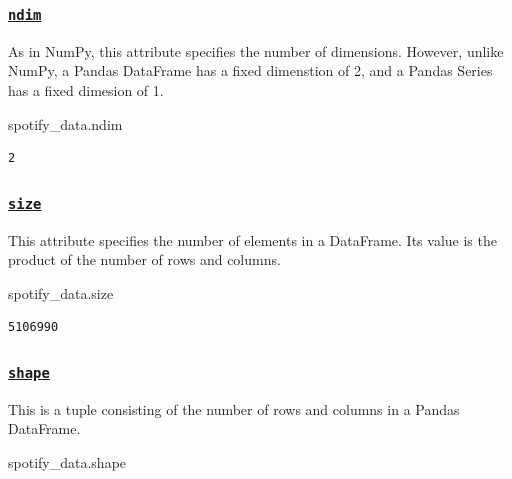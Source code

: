 \documentclass[
  letterpaper,
  DIV=11,
  numbers=noendperiod]{scrreprt}
\newenvironment{Shaded}{\begin{snugshade}}{\end{snugshade}}
\newcommand{\NormalTok}[1]{\textcolor[rgb]{0.00,0.23,0.31}{#1}}
\begin{document}
\hypertarget{ndim-1}{%
\subsubsection{\texorpdfstring{\href{https://pandas.pydata.org/docs/reference/api/pandas.DataFrame.ndim.html}{\texttt{ndim}}}{ndim}}\label{ndim-1}}

As in NumPy, this attribute specifies the number of dimensions. However,
unlike NumPy, a Pandas DataFrame has a fixed dimenstion of 2, and a
Pandas Series has a fixed dimesion of 1.

\begin{Shaded}
\begin{Highlighting}[]
\NormalTok{spotify\_data.ndim}
\end{Highlighting}
\end{Shaded}

\begin{verbatim}
2
\end{verbatim}

\hypertarget{size-1}{%
\subsubsection{\texorpdfstring{\href{https://pandas.pydata.org/docs/reference/api/pandas.DataFrame.size.html}{\texttt{size}}}{size}}\label{size-1}}

This attribute specifies the number of elements in a DataFrame. Its
value is the product of the number of rows and columns.

\begin{Shaded}
\begin{Highlighting}[]
\NormalTok{spotify\_data.size}
\end{Highlighting}
\end{Shaded}

\begin{verbatim}
5106990
\end{verbatim}

\hypertarget{shape-1}{%
\subsubsection{\texorpdfstring{\href{https://pandas.pydata.org/docs/reference/api/pandas.DataFrame.shape.html}{\texttt{shape}}}{shape}}\label{shape-1}}

This is a tuple consisting of the number of rows and columns in a Pandas
DataFrame.

\begin{Shaded}
\begin{Highlighting}[]
\NormalTok{spotify\_data.shape}
\end{Highlighting}
\end{Shaded}
\end{document}
